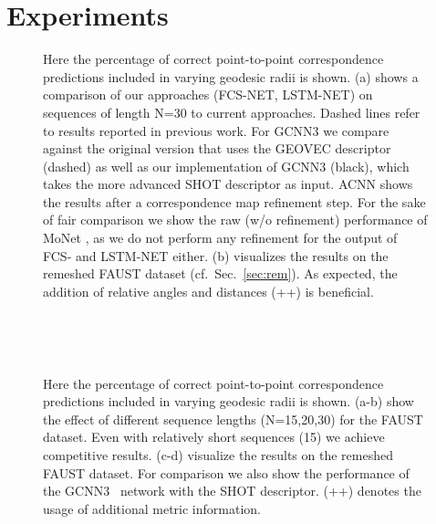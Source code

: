 \documentclass[runningheads]{llncs}
\begin{document}
\section{Experiments}

\begin{figure}[b!]
\centering
{}
\caption{Here the percentage of correct point-to-point correspondence predictions included in varying geodesic radii is shown. 
(a) shows a comparison of our approaches (FCS-NET, LSTM-NET) on sequences of length N=30 to current approaches. Dashed lines refer to results reported in previous work. For GCNN3 \cite{masci2015geodesic} we compare against the original version that uses the GEOVEC descriptor (dashed) as well as our implementation of GCNN3 (black), which takes the more advanced SHOT descriptor as input. ACNN \cite{boscaini2016learning} shows the results after a correspondence map refinement step. For the sake of fair comparison we show the raw (w/o refinement) performance of MoNet \cite{monti2017geometric}, as we do not perform any refinement for the output of FCS- and LSTM-NET either. (b) visualizes the results on the remeshed FAUST dataset (cf.\ Sec.~\ref{sec:rem}). As expected, the addition of relative angles and distances (++) is beneficial.\label{fig:quantitative}}
\end{figure}
\begin{figure}[tb]
\centering
\begin{minipage}{0.49\textwidth}
\centering
{}\\
\end{minipage}
\begin{minipage}{0.49\textwidth}
\centering
{}\\
\end{minipage}
\caption{Here the percentage of correct point-to-point correspondence predictions included in varying geodesic radii is shown. 
(a-b) show the effect of different sequence lengths (N=15,20,30) for the FAUST dataset. Even with relatively short sequences (15) we achieve competitive results. (c-d) visualize the results on the remeshed FAUST dataset. For comparison we also show the performance of the GCNN3~\cite{masci2015geodesic} network with the SHOT descriptor. (++) denotes the usage of additional metric  information.\label{fig:quantitative_2}}
\end{figure}
\end{document}
